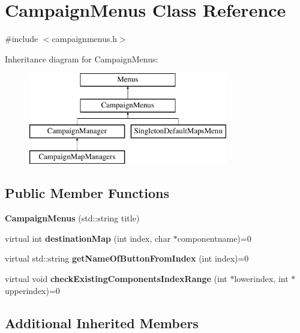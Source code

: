 \hypertarget{class_campaign_menus}{}\section{Campaign\+Menus Class Reference}
\label{class_campaign_menus}


{\ttfamily \#include $<$campaignmenus.\+h$>$}

Inheritance diagram for Campaign\+Menus\+:\begin{figure}[H]
\begin{center}
\leavevmode
\includegraphics[height=4.000000cm]{class_campaign_menus}
\end{center}
\end{figure}
\subsection*{Public Member Functions}
\begin{DoxyCompactItemize}
\item 
\hypertarget{class_campaign_menus_a9dc10c5e2feaae9958efe25ea316657e}{}\label{class_campaign_menus_a9dc10c5e2feaae9958efe25ea316657e} 
{\bfseries Campaign\+Menus} (std\+::string title)
\item 
\hypertarget{class_campaign_menus_a04274dcfb2c27ed2e47f3ab00a798244}{}\label{class_campaign_menus_a04274dcfb2c27ed2e47f3ab00a798244} 
virtual int {\bfseries destination\+Map} (int index, char $\ast$componentname)=0
\item 
\hypertarget{class_campaign_menus_a3b6293c1ba18c53e1560489a8585663d}{}\label{class_campaign_menus_a3b6293c1ba18c53e1560489a8585663d} 
virtual std\+::string {\bfseries get\+Name\+Of\+Button\+From\+Index} (int index)=0
\item 
\hypertarget{class_campaign_menus_a43d18cca1a6e4ded6d6fb6470b499872}{}\label{class_campaign_menus_a43d18cca1a6e4ded6d6fb6470b499872} 
virtual void {\bfseries check\+Existing\+Components\+Index\+Range} (int $\ast$lowerindex, int $\ast$upperindex)=0
\end{DoxyCompactItemize}
\subsection*{Additional Inherited Members}


